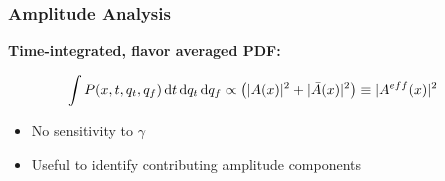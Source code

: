 \documentclass{beamer}
\begin{document}
\begin{frame}
	\frametitle{Amplitude Analysis}

	\centering
		\small
	\textbf{Time-integrated, flavor averaged PDF:}
	
		\scriptsize

\begin{block}{}
\begin{align*}
	\int P(x,t,q_t,q_f) \, \text d t \, \text d q_t \, \text d q_f &\propto   \left( \vert A(x) \vert^2 + \vert \bar A(x) \vert^2 \right) \equiv \vert A^{eff}(x) \vert^2
\end{align*}
\end{block}

	\begin{block}{}
	\begin{itemize}
		\item No sensitivity to $\gamma$
		\item Useful to identify contributing amplitude components
	\end{itemize}
	\end{block}	

\end{frame}



%
%	
%			
\end{document}
